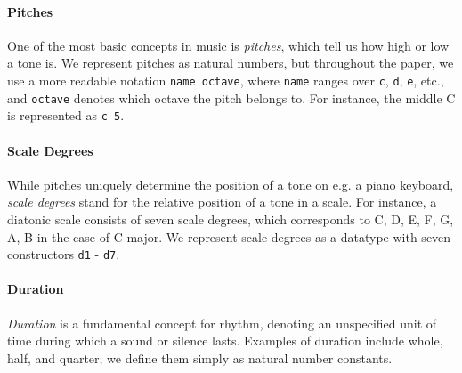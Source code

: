 \paragraph{Pitches}

One of the most basic concepts in music is \emph{pitches}, which tell us
how high or low a tone is.
We represent pitches as natural numbers, but throughout the paper,
we use a more readable notation \texttt{name octave}, where
\texttt{name} ranges over \texttt{c}, \texttt{d}, \texttt{e}, etc.,
and \texttt{octave} denotes which octave the pitch belongs to.
For instance, the middle C is represented as \texttt{c 5}.




\paragraph{Scale Degrees}

While pitches uniquely determine the position of a tone on e.g.
a piano keyboard, \emph{scale degrees} stand for the relative position
of a tone in a scale.
For instance, a diatonic scale consists of seven scale degrees, which
corresponds to C, D, E, F, G, A, B in the case of C major.
We represent scale degrees as a datatype with seven constructors
\texttt{d1} - \texttt{d7}.

\paragraph{Duration}

\emph{Duration} is a fundamental concept for rhythm, denoting an
unspecified unit of time during which a sound or silence lasts.
Examples of duration include whole, half, and quarter;
we define them simply as natural number constants.



